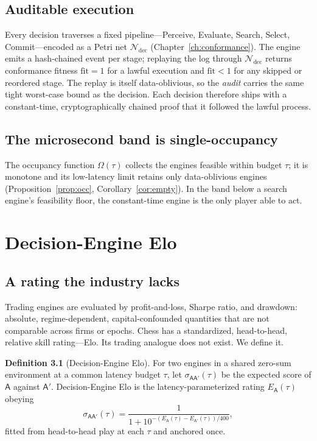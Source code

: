 \documentclass[11pt,oneside]{book}
\theoremstyle{definition}
\newtheorem{definition}{Definition}[chapter]
\theoremstyle{plain}
\theoremstyle{remark}
\newcommand{\Elo}{E}
\newcommand{\Engine}{\mathsf{A}}
\newcommand{\budget}{\tau}
\newcommand{\score}{\sigma}
\newcommand{\occ}{\Omega}
\newcommand{\fit}{\mathrm{fit}}
\begin{document}
\section{Auditable execution}
Every decision traverses a fixed pipeline---\textsf{Perceive}, \textsf{Evaluate},
\textsf{Search}, \textsf{Select}, \textsf{Commit}---encoded as a Petri net
$\mathcal{N}_{\mathrm{dec}}$ (Chapter~\ref{ch:conformance}). The engine emits a
hash-chained event per stage; replaying the log through $\mathcal{N}_{\mathrm{dec}}$
returns conformance fitness $\fit=1$ for a lawful execution and $\fit<1$ for any skipped
or reordered stage. The replay is itself data-oblivious, so the \emph{audit} carries the
same tight worst-case bound as the decision. Each decision therefore ships with a
constant-time, cryptographically chained proof that it followed the lawful process.

\section{The microsecond band is single-occupancy}
The occupancy function $\occ(\budget)$ collects the engines feasible within budget
$\budget$; it is monotone and its low-latency limit retains only data-oblivious engines
(Proposition~\ref{prop:occ}, Corollary~\ref{cor:empty}). In the band below a search
engine's feasibility floor, the constant-time engine is the only player able to act.

\chapter{Decision-Engine Elo}\label{ch:eloTau}

\section{A rating the industry lacks}
Trading engines are evaluated by profit-and-loss, Sharpe ratio, and drawdown: absolute,
regime-dependent, capital-confounded quantities that are not comparable across firms or
epochs. Chess has a standardized, head-to-head, relative skill rating---Elo. Its trading
analogue does not exist. We define it.

\begin{definition}[Decision-Engine Elo]\label{def:eloTau}
For two engines in a shared zero-sum environment at a common latency budget $\budget$, let
$\score_{\Engine\Engine'}(\budget)$ be the expected score of $\Engine$ against $\Engine'$.
Decision-Engine Elo is the latency-parameterized rating $\Elo_\Engine(\budget)$ obeying
\[
  \score_{\Engine\Engine'}(\budget)=
  \frac{1}{1+10^{-(\Elo_\Engine(\budget)-\Elo_{\Engine'}(\budget))/400}},
\]
fitted from head-to-head play at each $\budget$ and anchored once.
\end{definition}
\end{document}
